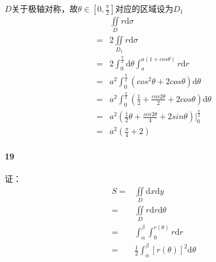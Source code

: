\documentclass[UTF8]{ctexart}
\begin{document}
$D$关于极轴对称，故$\theta \in [0, \frac{\pi}{2} ]$对应的区域设为$D_1$
\begin{align*}
    &\iint \limits_D r \mathrm{d}\sigma \\
    =& 2\iint \limits_{D_1} r \mathrm{d}\sigma \\
    =& 2 \int_{0}^{\frac{\pi}{2}} \mathrm{d}\theta \int_{a}^{a(1+cos\theta)} r \mathrm{d}r \\
    =& a^2 \int_{0}^{\frac{\pi}{2}} (cos^2\theta+2cos\theta)\mathrm{d}\theta \\
    =& a^2 \int_{0}^{\frac{\pi}{2}} (\frac{1}{2} +\frac{cos2\theta}{2}+2cos\theta) \mathrm{d}\theta \\
    =& a^2 (\frac{1}{2} \theta +\frac{sin2\theta}{4} +2sin\theta)
    \big|_{0}^{\frac{\pi}{2}} \\
    =& a^2 (\frac{\pi}{4}+2) 
\end{align*}
\paragraph*{19}
证：
\begin{align*}
    S=& \iint \limits_D \mathrm{d}x \mathrm{d}y \\
     =& \iint \limits_D r \mathrm{d}r \mathrm{d}\theta \\
     =& \int_{\alpha}^{\beta} \int_{0}^{r(\theta)} r \mathrm{d}r \\
     =& \frac{1}{2} \int_{\alpha}^{\beta} [r(\theta)]^2 \mathrm{d}\theta
\end{align*}
\end{document}

